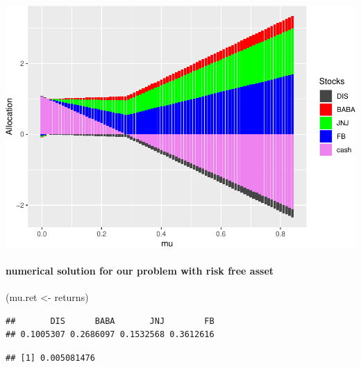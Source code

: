 \documentclass[]{article}
\newenvironment{Shaded}{\begin{snugshade}}{\end{snugshade}}
\newcommand{\KeywordTok}[1]{\textcolor[rgb]{0.13,0.29,0.53}{\textbf{#1}}}
\newcommand{\DataTypeTok}[1]{\textcolor[rgb]{0.13,0.29,0.53}{#1}}
\newcommand{\FloatTok}[1]{\textcolor[rgb]{0.00,0.00,0.81}{#1}}
\newcommand{\StringTok}[1]{\textcolor[rgb]{0.31,0.60,0.02}{#1}}
\newcommand{\OperatorTok}[1]{\textcolor[rgb]{0.81,0.36,0.00}{\textbf{#1}}}
\newcommand{\NormalTok}[1]{#1}
\let\oldparagraph\paragraph
\renewcommand{\paragraph}[1]{\oldparagraph{#1}\mbox{}}
\begin{document}
\includegraphics{Markowitz_Research_Me_files/figure-latex/unnamed-chunk-26-2.pdf}

\paragraph{numerical solution for our problem with risk free
asset}\label{numerical-solution-for-our-problem-with-risk-free-asset}

\begin{Shaded}
\begin{Highlighting}[]
\NormalTok{(mu.ret <-}\StringTok{ }\NormalTok{returns)}
\end{Highlighting}
\end{Shaded}

\begin{verbatim}
##       DIS      BABA       JNJ        FB 
## 0.1005307 0.2686097 0.1532568 0.3612616
\end{verbatim}

\begin{Shaded}
\end{Shaded}

\begin{verbatim}
## [1] 0.005081476
\end{verbatim}

\begin{Shaded}
\end{Shaded}
\end{document}
